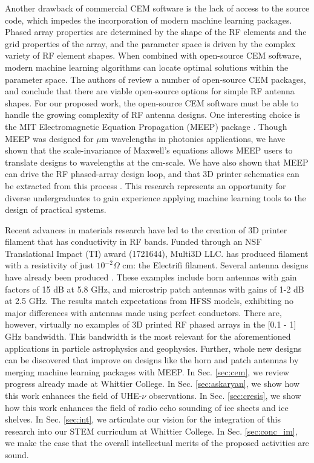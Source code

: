 \documentclass[../../main.tex]{subfiles}
\begin{document}
Another drawback of commercial CEM software is the lack of access to the source code, which impedes the incorporation of modern machine learning packages.  Phased array properties are determined by the shape of the RF elements and the grid properties of the array, and the parameter space is driven by the complex variety of RF element shapes.  When combined with open-source CEM software, modern machine learning algorithms can locate optimal solutions within the parameter space.  The authors of \cite{10.3390/electronics8121506} review a number of open-source CEM packages, and conclude that there are viable open-source options for simple RF antenna shapes.  For our proposed work, the open-source CEM software must be able to handle the growing complexity of RF antenna designs.  One interesting choice is the MIT Electromagnetic Equation Propagation (MEEP) package \cite{10.1016/j.cpc.2009.11.008}.  Though MEEP was designed for $\mu$m wavelengths in photonics applications, we have shown that the scale-invariance of Maxwell's equations allows MEEP users to translate designs to wavelengths at the cm-scale.  We have also shown that MEEP can drive the RF phased-array design loop, and that 3D printer schematics can be extracted from this process \cite{electronics10040415,meepcon2022,10.1016/j.cpc.2009.11.008}.  This research represents an opportunity for diverse undergraduates to gain experience applying machine learning tools to the design of practical systems.  \\ \vspace{2.5mm}

Recent advances in materials research have led to the creation of 3D printer filament that has conductivity in RF bands.  Funded through an NSF Translational Impact (TI) award (1721644), Multi3D LLC. has produced filament with a resistivity of just $10^{-2} \Omega$ cm: the Electrifi filament.  Several antenna designs have already been produced \cite{8786183,10.1049/iet-map.2017.0104}.  These examples include horn antennas with gain factors of 15 dB at 5.8 GHz, and microstrip patch antennas with gains of 1-2 dB at 2.5 GHz.  The results match expectations from HFSS models, exhibiting no major differences with antennas made using perfect conductors.  There are, however, virtually no examples of 3D printed RF phased arrays in the [0.1 - 1] GHz bandwidth.  This bandwidth is the most relevant for the aforementioned applications in particle astrophysics and geophysics.  Further, whole new designs can be discovered that improve on designs like the horn and patch antennas by merging machine learning packages with MEEP.  In Sec. \ref{sec:cem}, we review progress already made at Whittier College.  In Sec. \ref{sec:askaryan}, we show how this work enhances the field of UHE-$\nu$ observations.  In Sec. \ref{sec:cresis}, we show how this work enhances the field of radio echo sounding of ice sheets and ice shelves.  In Sec. \ref{sec:int}, we articulate our vision for the integration of this research into our STEM curriculum at Whittier College.  In Sec. \ref{sec:conc_im}, we make the case that the overall intellectual merits of the proposed activities are sound.
\end{document}
